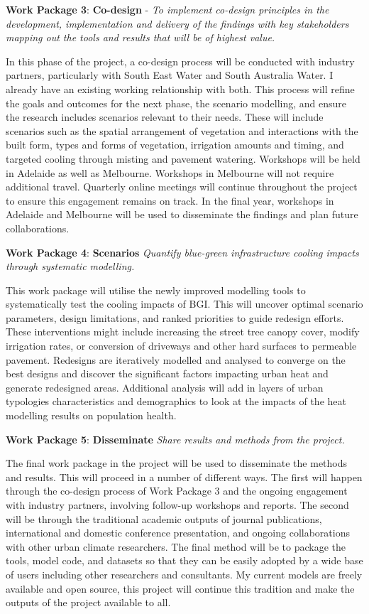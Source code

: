\textbf{Work Package 3}: \textbf{Co-design} - \emph{To implement co-design principles in the development, implementation and delivery of the findings with key stakeholders mapping out the tools and results that will be of highest value. }

In this phase of the project, a co-design process will be conducted with industry partners, particularly with South East Water and South Australia Water. I already have an existing working relationship with both. This process will refine the goals and outcomes for the next phase, the scenario modelling, and ensure the research includes scenarios relevant to their needs. These will include scenarios such as the spatial arrangement of vegetation and interactions with the built form, types and forms of vegetation, irrigation amounts and timing, and targeted cooling through misting and pavement watering. Workshops will be held in Adelaide as well as Melbourne. Workshops in Melbourne will not require additional travel. Quarterly online meetings will continue throughout the project to ensure this engagement remains on track. In the final year, workshops in Adelaide and Melbourne will be used to disseminate the findings and plan future collaborations.

\textbf{Work Package 4}: \textbf{Scenarios} \emph{Quantify blue-green infrastructure cooling impacts through systematic modelling.  }

This work package will utilise the newly improved modelling tools to systematically test the cooling impacts of BGI. This will uncover optimal scenario parameters, design limitations, and ranked priorities to guide redesign efforts. These interventions might include increasing the street tree canopy cover, modify irrigation rates, or  conversion of driveways and other hard surfaces to permeable pavement. Redesigns are iteratively modelled and analysed to converge on the best designs and discover the significant factors impacting urban heat and generate redesigned areas. Additional analysis will add in layers of urban typologies characteristics and demographics to look at the impacts of the heat modelling results on population health.
 
\textbf{Work Package 5}: \textbf{Disseminate} \emph{Share results and methods from the project.  }

The final work package in the project will be used to disseminate the methods and results. This will proceed in a number of different ways. The first will happen through the co-design process of Work Package 3 and the ongoing engagement with industry partners, involving follow-up workshops and reports. The second will be through the traditional academic outputs of journal publications, international and domestic conference presentation, and ongoing collaborations with other urban climate researchers. The final method will be to package the tools, model code, and datasets so that they can be easily adopted by a wide base of users including other researchers and consultants. My current models are freely available and open source, this project will continue this tradition and make the outputs of the project available to all.

